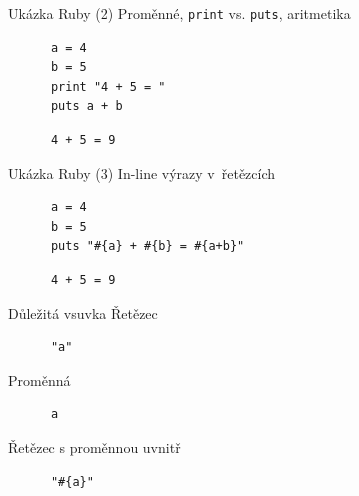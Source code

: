 \documentclass{beamer}
\begin{document}
\begin{frame}[fragile]{Ukázka Ruby (2)}
  Proměnné, \texttt{print} vs. \texttt{puts}, aritmetika
  \begin{block}{}
    \smallskip \footnotesize
    {\scriptsize \begin{verbatim}
      a = 4
      b = 5
      print "4 + 5 = "
      puts a + b
    \end{verbatim}}
  \end{block}
  \pause
  \begin{block}{}
    \smallskip \footnotesize
    {\scriptsize \begin{verbatim}
      4 + 5 = 9
    \end{verbatim}}
  \end{block}
\end{frame}

\begin{frame}[fragile]{Ukázka Ruby (3)}
  In-line výrazy v~řetězcích
  \begin{block}{}
    \smallskip \footnotesize
    {\scriptsize \begin{verbatim}
      a = 4
      b = 5
      puts "#{a} + #{b} = #{a+b}"
    \end{verbatim}}
  \end{block}
  \pause
  \begin{block}{}
    \smallskip \footnotesize
    {\scriptsize \begin{verbatim}
      4 + 5 = 9
    \end{verbatim}}
  \end{block}
\end{frame}

\begin{frame}[fragile]{Důležitá vsuvka}
  Řetězec
  \begin{block}{}
    \smallskip \footnotesize
    {\scriptsize \begin{verbatim}
      "a"
    \end{verbatim}}
  \end{block}
  \pause
  Proměnná
  \begin{block}{}
    \smallskip \footnotesize
    {\scriptsize \begin{verbatim}
      a
    \end{verbatim}}
  \end{block}
  \pause
  Řetězec s proměnnou uvnitř
  \begin{block}{}
    \smallskip \footnotesize
    {\scriptsize \begin{verbatim}
      "#{a}"
    \end{verbatim}}
  \end{block}
\end{frame}
\end{document}
